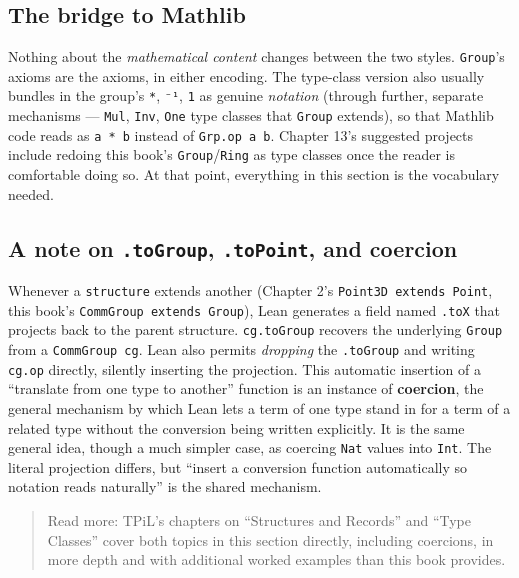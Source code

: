 \subsection{The bridge to Mathlib}\label{sec:05-rigor-check:01-structure-vs-class:4}

Nothing about the \emph{mathematical content} changes between the two styles. \texttt{Group}'s axioms are the axioms, in either encoding. The type-class version also usually bundles in the group's \texttt{*}, \texttt{⁻¹}, \texttt{1} as genuine \emph{notation} (through further, separate mechanisms --- \texttt{Mul}, \texttt{Inv}, \texttt{One} type classes that \texttt{Group} extends), so that Mathlib code reads as \texttt{a * b} instead of \texttt{Grp.op a b}. Chapter 13's suggested projects include redoing this book's \texttt{Group}/\texttt{Ring} as type classes once the reader is comfortable doing so. At that point, everything in this section is the vocabulary needed.

\subsection{\texorpdfstring{A note on \texttt{.toGroup}, \texttt{.toPoint}, and coercion}{A note on .toGroup, .toPoint, and coercion}}\label{sec:05-rigor-check:01-structure-vs-class:5}

Whenever a \texttt{structure} extends another (Chapter 2's \texttt{Point3D extends Point}, this book's \texttt{CommGroup extends Group}), Lean generates a field named \texttt{.toX} that projects back to the parent structure. \texttt{cg.toGroup} recovers the underlying \texttt{Group} from a \texttt{CommGroup cg}. Lean also permits \emph{dropping} the \texttt{.toGroup} and writing \texttt{cg.op} directly, silently inserting the projection. This automatic insertion of a ``translate from one type to another'' function is an instance of \textbf{coercion}, the general mechanism by which Lean lets a term of one type stand in for a term of a related type without the conversion being written explicitly. It is the same general idea, though a much simpler case, as coercing \texttt{Nat} values into \texttt{Int}. The literal projection differs, but ``insert a conversion function automatically so notation reads naturally'' is the shared mechanism.

\begin{quote}
Read more: TPiL's chapters on ``Structures and Records'' and ``Type Classes'' cover both topics in this section directly, including coercions, in more depth and with additional worked examples than this book provides.
\end{quote}
